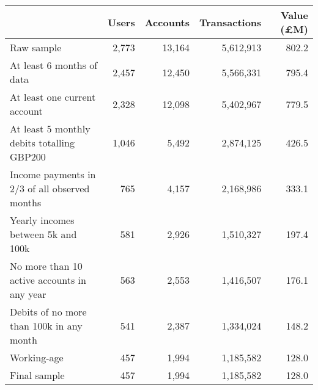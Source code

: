 \begin{tabular}{lrrrr}
\toprule
                                               &  Users & Accounts & Transactions & Value (\pounds M) \\
\midrule
                                    Raw sample &  2,773 &   13,164 &    5,612,913 &             802.2 \\
                     At least 6 months of data &  2,457 &   12,450 &    5,566,331 &             795.4 \\
                  At least one current account &  2,328 &   12,098 &    5,402,967 &             779.5 \\
    At least 5 monthly debits totalling GBP200 &  1,046 &    5,492 &    2,874,125 &             426.5 \\
 Income payments in 2/3 of all observed months &    765 &    4,157 &    2,168,986 &             333.1 \\
            Yearly incomes between 5k and 100k &    581 &    2,926 &    1,510,327 &             197.4 \\
   No more than 10 active accounts in any year &    563 &    2,553 &    1,416,507 &             176.1 \\
      Debits of no more than 100k in any month &    541 &    2,387 &    1,334,024 &             148.2 \\
                                   Working-age &    457 &    1,994 &    1,185,582 &             128.0 \\
                                  Final sample &    457 &    1,994 &    1,185,582 &             128.0 \\
\bottomrule
\end{tabular}
